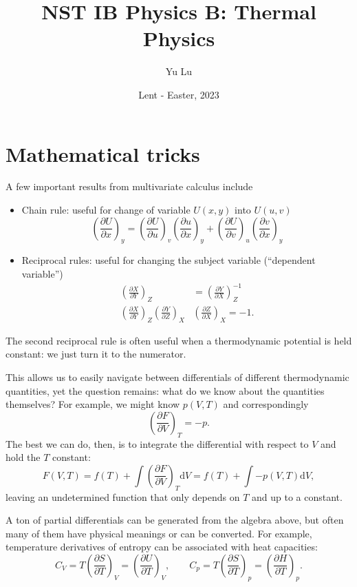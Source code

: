 \documentclass{article}
\title{NST IB Physics B: Thermal Physics}
\date{Lent - Easter, 2023}
\author{Yu Lu}
\theoremstyle{nonumberplain}
\begin{document}
\maketitle
\tableofcontents 
\newpage
\section{Mathematical tricks}
A few important results from multivariate calculus include
\begin{itemize}
    \item Chain rule: useful for change of variable $U(x,y)$ into $U(u,v)$
    \[
        \left(\frac{\partial U}{\partial x} \right)_y = 
        \left(\frac{\partial U}{\partial u} \right)_v \left( \frac{\partial u}{\partial x} \right)_y
        + \left(\frac{\partial U}{\partial v} \right)_u \left( \frac{\partial v}{\partial x} \right)_y
    \]
    \item Reciprocal rules: useful for changing the subject variable (``dependent variable'')
    \[
        \begin{aligned}
            \left(\frac{\partial X}{\partial Y} \right)_Z &= \left(\frac{\partial Y}{\partial X} \right)_Z^{-1} \\
            \left(\frac{\partial X}{\partial Y} \right)_Z 
            \left(\frac{\partial Y}{\partial Z} \right)_X &
            \left(\frac{\partial Z}{\partial X} \right)_X = -1.
        \end{aligned}
    \]
\end{itemize}

The second reciprocal rule is often useful when a thermodynamic potential is held constant: we just turn it to the numerator. 

This allows us to easily navigate between differentials of different thermodynamic quantities, yet the question remains: what do we know about the quantities themselves? For example, we might know $p(V,T)$ and correspondingly
\[
    \left( \frac{\partial F}{\partial V} \right)_{T} = -p.
\]
The best we can do, then, is to integrate the differential with respect to $V$ and hold the $T$ constant:
\[
    F (V,T)
    = f(T) + \int \left( \frac{\partial F}{\partial V} \right)_{T} \mathrm{d} V
    = f(T) + \int -p(V,T) \mathrm{d} V, 
\]
leaving an undetermined function that only depends on $T$ and up to a constant. 

A ton of partial differentials can be generated from the algebra above, but often many of them have physical meanings or can be converted. For example, temperature derivatives of entropy can be associated with heat capacities:
\[
    \boxed{
    C_V = T \left(\frac{\partial S}{\partial T} \right)_V = \left(\frac{\partial U}{\partial T} \right)_V
    , \qquad 
    C_p = T \left(\frac{\partial S}{\partial T} \right)_p = \left(\frac{\partial H}{\partial T} \right)_p.}
\]
\end{document}
